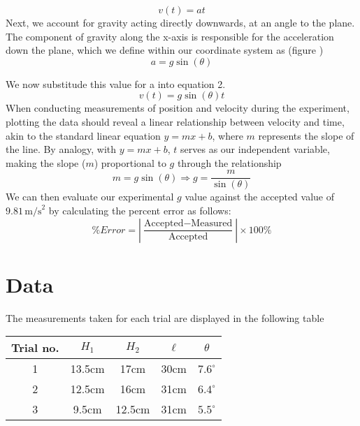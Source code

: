 \documentclass{report}
\begin{document}
    \begin{equation}
        v(t) = at
    \end{equation}
    \bigbreak \noindent 
    Next, we account for gravity acting directly downwards, at an angle to the plane. The component of gravity along the x-axis is responsible for the acceleration down the plane, which we define within our coordinate system as (figure \thefigtitle)
    \begin{equation}
       a=g\sin{\left(\theta\right)} 
    \end{equation}
    \bigbreak \noindent
    \begin{figure}[ht]
        \centering
        \label{fig:figab}
    \end{figure}
    \bigbreak \noindent 
    We now substitude this value for a into equation 2.
    \begin{equation}
       v(t) = g\sin{\left(\theta \right)}t
    \end{equation}
    \bigbreak \noindent 
    When conducting measurements of position and velocity during the experiment, plotting the data should reveal a linear relationship between velocity and time, akin to the standard linear equation \(y = mx + b\), where \(m\) represents the slope of the line. By analogy, with \(y = mx + b\), \(t\) serves as our independent variable, making the slope (\(m\)) proportional to \(g\) through the relationship
    \begin{equation}
        m = g \sin(\theta) \Rightarrow g = \frac{m}{\sin(\theta)} 
    \end{equation}
    We can then evaluate our experimental \(g\) value against the accepted value of \(9.81 \, \text{m/s}^2\) by calculating the percent error as follows:
    \begin{equation}
        \%Error = \left| \frac{\text{Accepted} - \text{Measured}}{\text{Accepted}} \right| \times 100\%
    \end{equation}
    

    \bigbreak \noindent 
    \section{Data}
    \bigbreak \noindent 
    The measurements taken for each trial are displayed in the following table
    \bigbreak \noindent 
    \begin{center}
        \begin{tabular}{c|c|c|c|c}
            Trial no. & $H_{1}$ & $H_{2}$ & $\ell$ & $\theta$\\
            \hline
            1 & 13.5cm & 17cm &30cm & $7.6^{\circ}$\\
            2 & 12.5cm & 16cm & 31cm & $6.4^{\circ}$\\
            3  &9.5cm & 12.5cm & 31cm & $5.5^{\circ}$
        \end{tabular}
    \end{center}
\end{document}
